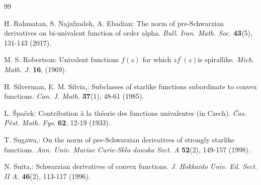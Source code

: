 \documentclass[a4paper,12pt]{amsart}
\theoremstyle{plain}
\theoremstyle{definition}
\theoremstyle{plain}
\begin{document}
\begin{thebibliography}{99}


  {\sc H. Rahmatan}, {\sc S. Najafzadeh}, {\sc A. Ebadian}: The norm of pre-Schwarzian derivatives on bi-univalent	function of order alpha. \textit{Bull. Iran. Math. Soc.} \textbf{43}(5), 131-143 (2017). 


  {\sc M. S. Robertson}: Univalent functions $f(z)$ for which $zf^\prime(z)$is spirallike. \textit{ Mich. Math. J.} \textbf{16}, (1969).


  {\sc H. Silverman}, {\sc E. M. Silvia},: Subclasses of starlike functions subordinate to convex functions.  \textit{Can. J. Math.} \textbf{37}(1), 48-61 (1985).

  {\sc L. Špaček}: Contribution à la théorie des functions univalentes (in Czech). \textit{ Čas. Pěst. Math. Fys.} \textbf{62}, 12-19 (1933).

  {\sc T. Sugawa},: On the norm of pre-Schwarzian derivatives of strongly starlike functions. \textit{ Ann. Univ. Mariae Curie-Skło dowska Sect. A} \textbf{52}(2), 149-157 (1998).

  {\sc N. Suita},: Schwarzian derivatives of convex functions.  \textit{ J. Hokkaido Univ. Ed. Sect. II A.} \textbf{46}(2), 113-117 (1996).






\end{thebibliography}
\end{document}
